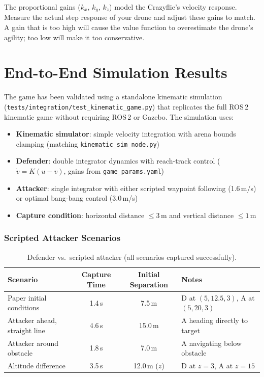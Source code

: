 \documentclass[11pt,a4paper]{article}
\begin{document}
The proportional gains ($k_x$, $k_y$, $k_z$) model the Crazyflie's velocity response. Measure the actual step response of your drone and adjust these gains to match. A gain that is too high will cause the value function to overestimate the drone's agility; too low will make it too conservative.


\section{End-to-End Simulation Results}

The game has been validated using a standalone kinematic simulation (\texttt{tests/integration/test\_kinematic\_game.py}) that replicates the full ROS\,2 kinematic game without requiring ROS\,2 or Gazebo. The simulation uses:

\begin{itemize}[noitemsep]
    \item \textbf{Kinematic simulator}: simple velocity integration with arena bounds clamping (matching \texttt{kinematic\_sim\_node.py})
    \item \textbf{Defender}: double integrator dynamics with reach-track control ($\dot{v} = K(u - v)$, gains from \texttt{game\_params.yaml})
    \item \textbf{Attacker}: single integrator with either scripted waypoint following (1.6\,m/s) or optimal bang-bang control (3.0\,m/s)
    \item \textbf{Capture condition}: horizontal distance $\leq 3$\,m and vertical distance $\leq 1$\,m
\end{itemize}

\subsubsection{Scripted Attacker Scenarios}

\begin{table}[h]
\centering
\caption{Defender vs.\ scripted attacker (all scenarios captured successfully).}
\begin{tabular}{lccl}
\toprule
\textbf{Scenario} & \textbf{Capture Time} & \textbf{Initial Separation} & \textbf{Notes} \\
\midrule
Paper initial conditions & 1.4\,s & 7.5\,m & D at $(5, 12.5, 3)$, A at $(5, 20, 3)$ \\
Attacker ahead, straight line & 4.6\,s & 15.0\,m & A heading directly to target \\
Attacker around obstacle & 1.8\,s & 7.0\,m & A navigating below obstacle \\
Altitude difference & 3.5\,s & 12.0\,m ($z$) & D at $z{=}3$, A at $z{=}15$ \\
\bottomrule
\end{tabular}
\end{table}
\end{document}
